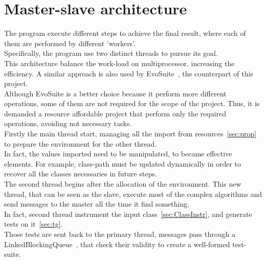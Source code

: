 \section{Master-slave architecture }\label{sec:MSArch}
The program execute different steps to achieve the final result, where each of them are performed by different 'workers'.\\
Specifically, the program use two distinct threads to pursue its goal.\\
This architecture balance the work-load on multiprocessor, increasing the efficiency.
A similar approach is also used by EvoSuite~\cite{evosuite}, the counterpart of this project.\\
Although EvoSuite is a better choice because it perform more different operations, some of them are not required for the scope of the project.
Thus, it is demanded a resource affordable project that perform only the required operations, avoiding not necessary tasks.\\
Firstly the main thread start, managing all the import from resources~\ref{sec:prop} to prepare the environment for the other thread.\\
In fact, the values imported need to be manipulated, to became effective elements.
For example, class-path must be updated dynamically in order to recover all the classes necessaries in future steps.\\
The second thread begins after the allocation of the environment.
This new thread, that can be seen as the slave, execute most of the complex algorithms and send messages to the master all the time it find something.\\
In fact, second thread instrument the input class~\ref{sec:ClassInstr}, and generate tests on it~\ref{sec:tg}.\\
Those tests are sent back to the primary thread, messages pass through a LinkedBlockingQueue~\cite{linkedBlockingQueue}, that check their validity to create a well-formed test-suite.\\